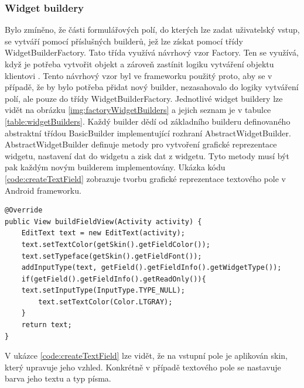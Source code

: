\subsubsection{Widget buildery}
Bylo zmíněno, že části formulářových polí, do kterých lze zadat uživatelský vstup, se vytváří pomocí příslušných builderů, jež lze získat pomocí třídy WidgetBuilderFactory. Tato třída využívá návrhový vzor Factory. Ten se využívá, když je potřeba vytvořit objekt a zároveň zastínit logiku vytváření objektu klientovi \cite{factorypattern}. Tento návrhový vzor byl ve frameworku použitý proto, aby se v případě, že by bylo potřeba přidat nový builder, nezasahovalo do logiky vytváření polí, ale pouze do třídy WidgetBuilderFactory. Jednotlivé widget buildery lze vidět na obrázku \ref{img:factoryWidgetBuilders} a jejich seznam je v tabulce \ref{table:widgetBuilders}. Každý builder dědí od základního builderu definovaného abstraktní třídou BasicBuilder implementující rozhraní AbstractWidgetBuilder. AbstractWidgetBuilder definuje metody pro vytvoření grafické reprezentace widgetu, nastavení dat do widgetu a zisk dat z widgetu. Tyto metody musí být pak každým novým builderem implementovány. Ukázka kódu \ref{code:createTextField} zobrazuje tvorbu grafické reprezentace textového pole v Android frameworku.

\begin{lstlisting}[caption=Ukázka tvorby grafické reprezentace textového pole,
label={code:createTextField}, basicstyle=\footnotesize]
@Override
public View buildFieldView(Activity activity) {
    EditText text = new EditText(activity);
    text.setTextColor(getSkin().getFieldColor());
    text.setTypeface(getSkin().getFieldFont());
    addInputType(text, getField().getFieldInfo().getWidgetType());
    if(getField().getFieldInfo().getReadOnly()){
	text.setInputType(InputType.TYPE_NULL);
        text.setTextColor(Color.LTGRAY);
    }
    return text;
}
\end{lstlisting} 

V ukázce \ref{code:createTextField} lze vidět, že na vstupní pole je aplikován skin, který upravuje jeho vzhled. Konkrétně v případě textového pole se nastavuje barva jeho textu a typ písma.

